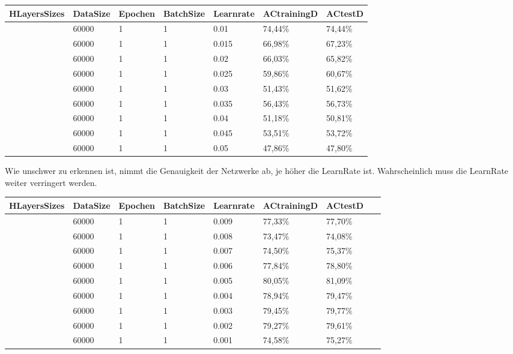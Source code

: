 \documentclass[12pt]{article}
\begin{document}
\begin{table}[H]
    \centering
    \begin{tabular}{|l|l|l|l|l|l|l|}
    \hline
        HLayersSizes & DataSize & Epochen & BatchSize & Learnrate & ACtrainingD & ACtestD \\ \hline
        [780, 100, 10] & 60000 & 1 & 1 & 0.01 & 74,44\% & 74,44\% \\ \hline
        [780, 100, 10] & 60000 & 1 & 1 & 0.015 & 66,98\% & 67,23\% \\ \hline
        [780, 100, 10] & 60000 & 1 & 1 & 0.02 & 66,03\% & 65,82\% \\ \hline
        [780, 100, 10] & 60000 & 1 & 1 & 0.025 & 59,86\% & 60,67\% \\ \hline
        [780, 100, 10] & 60000 & 1 & 1 & 0.03 & 51,43\% & 51,62\% \\ \hline
        [780, 100, 10] & 60000 & 1 & 1 & 0.035 & 56,43\% & 56,73\% \\ \hline
        [780, 100, 10] & 60000 & 1 & 1 & 0.04 & 51,18\% & 50,81\% \\ \hline
        [780, 100, 10] & 60000 & 1 & 1 & 0.045 & 53,51\% & 53,72\% \\ \hline
        [780, 100, 10] & 60000 & 1 & 1 & 0.05 & 47,86\% & 47,80\% \\ \hline
    \end{tabular}
\end{table}
	Wie unschwer zu erkennen ist, nimmt die Genauigkeit der Netzwerke ab, je höher die LearnRate ist. Wahrscheinlich muss die LearnRate weiter verringert werden.
\begin{table}[H]
    \centering
    \begin{tabular}{|l|l|l|l|l|l|l|l|}
    \hline
        HLayersSizes & DataSize & Epochen & BatchSize & Learnrate & ACtrainingD & ACtestD & ~ \\ \hline
        [780, 100, 10] & 60000 & 1 & 1 & 0.009 & 77,33\% & 77,70\% & ~ \\ \hline
        [780, 100, 10] & 60000 & 1 & 1 & 0.008 & 73,47\% & 74,08\% & ~ \\ \hline
        [780, 100, 10] & 60000 & 1 & 1 & 0.007 & 74,50\% & 75,37\% & ~ \\ \hline
        [780, 100, 10] & 60000 & 1 & 1 & 0.006 & 77,84\% & 78,80\% & ~ \\ \hline
        [780, 100, 10] & 60000 & 1 & 1 & 0.005 & 80,05\% & 81,09\% & ~ \\ \hline
        [780, 100, 10] & 60000 & 1 & 1 & 0.004 & 78,94\% & 79,47\% & ~ \\ \hline
        [780, 100, 10] & 60000 & 1 & 1 & 0.003 & 79,45\% & 79,77\% & ~ \\ \hline
        [780, 100, 10] & 60000 & 1 & 1 & 0.002 & 79,27\% & 79,61\% & ~ \\ \hline
        [780, 100, 10] & 60000 & 1 & 1 & 0.001 & 74,58\% & 75,27\% & ~ \\ \hline
    \end{tabular}
\end{table}
\end{document}
